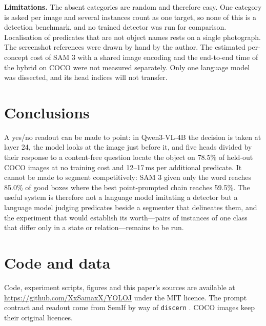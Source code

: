 \documentclass[10pt,twocolumn]{article}
\begin{document}
\textbf{Limitations.} The absent categories are random and therefore easy.
One category is asked per image and several instances count as one target, so
none of this is a detection benchmark, and no trained detector was run for
comparison. Localisation of predicates that are not object names rests on a
single photograph. The screenshot references were drawn by hand by the author.
The estimated per-concept cost of SAM 3 with a shared image encoding and the
end-to-end time of the hybrid on COCO were not measured separately. Only one
language model was dissected, and its head indices will not transfer.

\section{Conclusions}

A yes/no readout can be made to point: in Qwen3-VL-4B the decision is taken at
layer 24, the model looks at the image just before it, and five heads divided
by their response to a content-free question locate the object on 78.5\% of
held-out COCO images at no training cost and 12--17\,ms per additional
predicate. It cannot be made to segment competitively: SAM 3 given only the
word reaches 85.0\% of good boxes where the best point-prompted chain reaches
59.5\%. The useful system is therefore not a language model imitating a
detector but a language model judging predicates beside a segmenter that
delineates them, and the experiment that would establish its worth---pairs of
instances of one class that differ only in a state or relation---remains to be
run.

\section*{Code and data}

Code, experiment scripts, figures and this paper's sources are available at
\url{https://github.com/XxSamaxX/YOLOJ} under the MIT licence. The prompt
contract and readout come from SemIf \cite{semif} by way of \texttt{discern}
\cite{discern}. COCO images keep their original licences.



\end{document}
